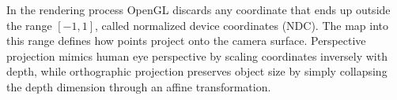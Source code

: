 % 


%


In the rendering process OpenGL discards any coordinate that ends up outside the range $[-1,1]$, called normalized device coordinates (NDC). The map into this range defines how points project onto the camera surface. Perspective projection mimics human eye perspective by scaling coordinates inversely with depth, while orthographic projection preserves object size by simply collapsing the depth dimension through an affine transformation. %

%
%

